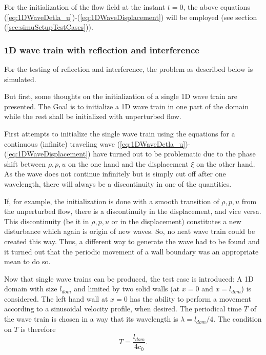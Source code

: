 \documentclass[11pt,a4paper,twoside]{report}
\begin{document}
For the initialization of the flow field at the instant $t=0$, the above equations (\ref{eq:1DWaveDetla_u})-(\ref{eq:1DWaveDisplacement}) will be employed (see section (\ref{sec:simuSetupTestCases})).


\subsubsection{1D wave train with reflection and interference}
\label{sec:GenIntro_1DWaveTrainReflect}
For the testing of reflection and interference, the problem as described below is simulated.

But first, some thoughts on the initialization of a single 1D wave train are presented.
The Goal is to initialize a 1D wave train in one part of the domain while the rest shall be initialized with unperturbed flow. %

First attempts to initialize the single wave train using the equations for a continuous (infinite) traveling wave (\ref{eq:1DWaveDetla_u})-(\ref{eq:1DWaveDisplacement}) have turned out to be problematic due to the phase shift between $\rho,p,u$ on the one hand and the displacement $\xi$ on the other hand. As the wave does not continue infinitely but is simply cut off after one wavelength, there will always be a discontinuity in one of the quantities.  

If, for example, the initialization is done with a smooth transition of $\rho,p,u$ from the unperturbed flow, there is a discontinuity in the displacement, and vice versa. This discontinuity (be it in $\rho,p,u$ or in the displacement) constitutes a new disturbance which again is origin of new waves. So, no neat wave train could be created this way. 
Thus, a different way to generate the wave had to be found and it turned out that the periodic movement of a wall boundary was an appropriate mean to do so. 

Now that single wave trains can be produced, the test case is introduced:
A 1D domain with size $l_{\mathit{dom}}$ and limited by two solid walls (at $x=0$ and $x=l_{\mathit{dom}}$) is considered. The left hand wall at $x=0$ has the ability to perform a movement according to a sinusoidal velocity profile, when desired.
The periodical time $T$ of the wave train is chosen in a way that its wavelength is
$\lambda=l_{\mathit{dom}}/4$. The condition on $T$ is therefore
\begin{equation}
 T=\frac{l_{\mathit{dom}}}{4 c_0}.
\end{equation}
\end{document}
